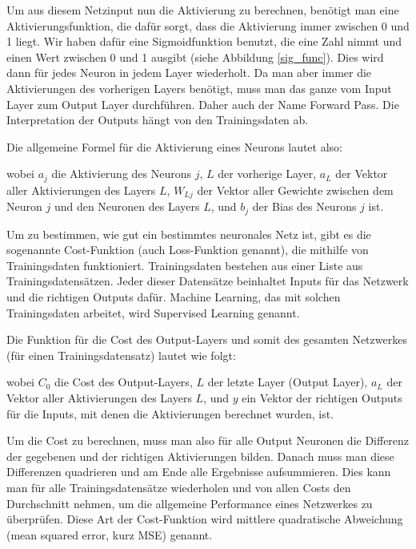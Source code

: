 \documentclass[11pt]{scrartcl}
\begin{document}
	Um aus diesem Netzinput nun die Aktivierung zu berechnen, benötigt man eine Aktivierungsfunktion, die dafür sorgt, dass die Aktivierung immer zwischen 0 und 1 liegt. Wir haben dafür eine Sigmoidfunktion benutzt, die eine Zahl nimmt und einen Wert zwischen 0 und 1 ausgibt (siehe Abbildung \ref{sig_func}). Dies wird dann für jedes Neuron in jedem Layer wiederholt. Da man aber immer die Aktivierungen des vorherigen Layers benötigt, muss man das ganze vom Input Layer zum Output Layer durchführen. Daher auch der Name Forward Pass. Die Interpretation der Outputs hängt von den Trainingsdaten ab.
	
	Die allgemeine Formel für die Aktivierung eines Neurons lautet also:


	\form{
	\[
		\sig(x)=\frac{1}{1+e^{-x}}
		\]
	\[
		a_{j} = \sig\left(\sum_{L} (a_{L} * W_{Lj}) + b_{j}\right)
		\]}
	
	\noindent wobei $a_j$ die Aktivierung des Neurons $j$, $L$ der vorherige Layer, $a_L$ der Vektor aller Aktivierungen des Layers $L$, $W_{Lj}$ der Vektor aller Gewichte zwischen dem Neuron $j$ und den Neuronen des Layers $L$, und $b_j$ der Bias des Neurons $j$ ist. \cite{brotcrunsher:forwardpass}	
	

	Um zu bestimmen, wie gut ein bestimmtes neuronales Netz ist, gibt es die sogenannte Cost-Funktion (auch Loss-Funktion genannt), die mithilfe von Trainingsdaten funktioniert.
	Trainingsdaten bestehen aus einer Liste aus Trainingsdatensätzen. Jeder dieser Datensätze beinhaltet Inputs für das Netzwerk und die richtigen Outputs dafür. Machine Learning, das mit solchen Trainingsdaten arbeitet, wird Supervised Learning genannt.

	Die Funktion für die Cost des Output-Layers und somit des gesamten Netzwerkes (für einen Trainingsdatensatz) lautet wie folgt:

	\form{ \[
		C_0 = (a_L - y)^2
	\]}


	\noindent wobei $C_0$ die Cost des Output-Layers, $L$ der letzte Layer (Output Layer), $a_L$ der Vektor aller Aktivierungen des Layers $L$, und $y$ ein Vektor der richtigen Outputs für die Inputs, mit denen die Aktivierungen berechnet wurden, ist. 
	
	Um die Cost zu berechnen, muss man also für alle Output Neuronen die Differenz der gegebenen und der richtigen Aktivierungen bilden. Danach muss man diese Differenzen quadrieren und am Ende alle Ergebnisse aufsummieren. Dies kann man für alle Trainingsdatensätze wiederholen und von allen Costs den Durchschnitt nehmen, um die allgemeine Performance eines Netzwerkes zu überprüfen. Diese Art der Cost-Funktion wird mittlere quadratische Abweichung (mean squared error, kurz MSE) genannt. 
	
\end{document}
